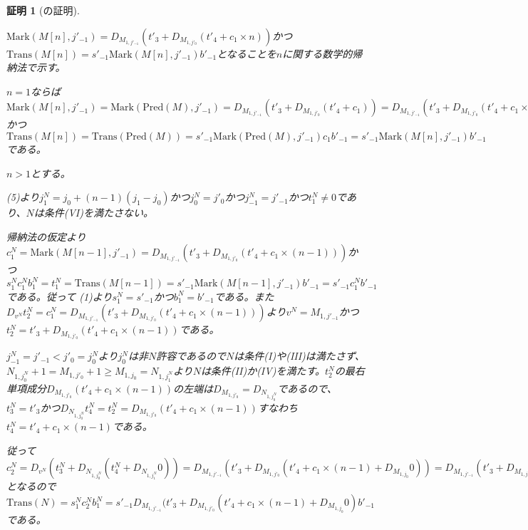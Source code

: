 \documentclass[dvipdfmx,uplatex]{jsarticle}
\theoremstyle{customnonumberbreakfortheorem}
\theoremstyle{customnonumberbreakforproof}
\newtheorem{hideableproof}{証明}
\begin{document}
\begin{hideableproof}[の証明]
\begin{indented}
\begin{indented}
\begin{indented}
				\item \(\textrm{Mark}(M[n],j'_{-1}) = D_{M_{1,j'_{-1}}}(t'_3 + D_{M_{1,j'_0}}(t'_4 + c_1 \times n))\)かつ\(\textrm{Trans}(M[n]) = s'_{-1} \textrm{Mark}(M[n],j'_{-1}) b'_{-1}\)となることを\(n\)に関する数学的帰納法で示す。
				\item \(n = 1\)ならば\(\textrm{Mark}(M[n],j'_{-1}) = \textrm{Mark}(\textrm{Pred}(M),j'_{-1}) = D_{M_{1,j'_{-1}}}(t'_3 + D_{M_{1,j'_0}}(t'_4 + c_1)) = D_{M_{1,j'_{-1}}}(t'_3 + D_{M_{1,j'_0}}(t'_4 + c_1 \times n))\)かつ\(\textrm{Trans}(M[n]) = \textrm{Trans}(\textrm{Pred}(M)) = s'_{-1} \textrm{Mark}(\textrm{Pred}(M),j'_{-1}) c_1 b'_{-1} = s'_{-1} \textrm{Mark}(M[n],j'_{-1}) b'_{-1}\)である。
				\item \(n > 1\)とする。
				\begin{indented}
					\item {} (5)より\(j_1^N = j_0+(n-1)(j_1-j_0)\)かつ\(j_0^N = j'_0\)かつ\(j_{-1}^N = j'_{-1}\)かつ\(t_1^N \neq 0\)であり、\(N\)は条件(VI)を満たさない。
					\item 帰納法の仮定より\(c_1^N = \textrm{Mark}(M[n-1],j'_{-1}) = D_{M_{1,j'_{-1}}}(t'_3 + D_{M_{1,j'_0}}(t'_4 + c_1 \times (n-1)))\)かつ\(s_1^N c_1^N b_1^N = t_1^N = \textrm{Trans}(M[n-1]) = s'_{-1} \textrm{Mark}(M[n-1],j'_{-1}) b'_{-1} = s'_{-1} c_1^N b'_{-1}\)である。従って (1)より\(s_1^N = s'_{-1}\)かつ\(b_1^N = b'_{-1}\)である。また\(D_{v^N} t_2^N = c_1^N = D_{M_{1,j'_{-1}}}(t'_3 + D_{M_{1,j'_0}}(t'_4 + c_1 \times (n-1)))\)より\(v^N = M_{1,j'_{-1}}\)かつ\(t_2^N = t'_3 + D_{M_{1,j'_0}}(t'_4 + c_1 \times (n-1))\)である。
					\item \(j_{-1}^N = j'_{-1} < j'_0 = j_0^N\)より\(j_0^N\)は非\(N\)許容であるので\(N\)は条件(I)や(III)は満たさず、\(N_{1,j_0^N}+1 = M_{1,j'_0}+1 \geq M_{1,j_0} = N_{1,j_1^N}\)より\(N\)は条件(II)か(IV)を満たす。\(t_2^N\)の最右単項成分\(D_{M_{1,j'_0}}(t'_4 + c_1 \times (n-1))\)の左端は\(D_{M_{1,j'_0}} = D_{N_{1,j_0^N}}\)であるので、\(t_3^N = t'_3\)かつ\(D_{N_{1,j_0^N}} t_4^N = t_2^N = D_{M_{1,j'_0}}(t'_4 + c_1 \times (n-1))\)すなわち\(t_4^N = t'_4 + c_1 \times (n-1)\)である。
					\item 従って\(c_2^N = D_{v^N}(t_3^N + D_{N_{1,j_0^N}}(t_4^N + D_{N_{1,j_1^N}} 0)) = D_{M_{1,j'_{-1}}}(t'_3 + D_{M_{1,j'_0}}(t'_4 + c_1 \times (n-1) + D_{M_{1,j_0}} 0)) = D_{M_{1,j'_{-1}}}(t'_3 + D_{M_{1,j'_0}}(t'_4 + c_1 \times (n-1) + D_{M_{1,j_0}} 0))\)となるので\(\textrm{Trans}(N) = s_1^N c_2^N b_1^N = s'_{-1} D_{M_{1,j'_{-1}}}(t'_3 +  D_{M_{1,j'_0}}(t'_4 + c_1 \times (n-1) + D_{M_{1,j_0}} 0) b'_{-1}\)である。

\end{indented}
\end{indented}
\end{indented}
\end{indented}
\end{hideableproof}
\end{document}
